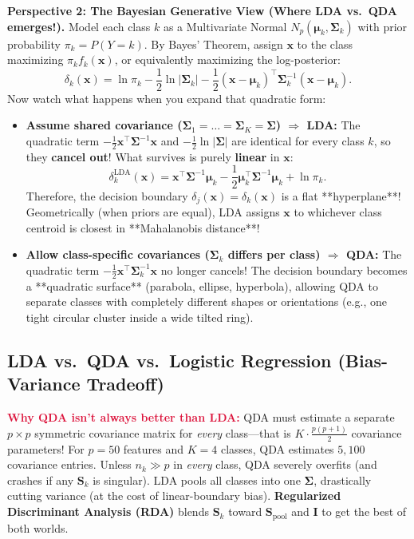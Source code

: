 \documentclass[11pt, a4paper]{article}
\begin{document}
\textbf{Perspective 2: The Bayesian Generative View (Where LDA vs.\ QDA emerges!).}
Model each class $k$ as a Multivariate Normal $N_p(\boldsymbol{\mu}_k, \boldsymbol{\Sigma}_k)$ with prior probability $\pi_k = P(Y = k)$. By Bayes' Theorem, assign $\mathbf{x}$ to the class maximizing $\pi_k f_k(\mathbf{x})$, or equivalently maximizing the log-posterior:
\[
    \delta_k(\mathbf{x}) = \ln \pi_k - \frac{1}{2}\ln|\boldsymbol{\Sigma}_k| - \frac{1}{2}(\mathbf{x} - \boldsymbol{\mu}_k)^\top \boldsymbol{\Sigma}_k^{-1}(\mathbf{x} - \boldsymbol{\mu}_k).
\]
Now watch what happens when you expand that quadratic form:
\begin{itemize}
    \item \textbf{Assume shared covariance ($\boldsymbol{\Sigma}_1 = \dots = \boldsymbol{\Sigma}_K = \boldsymbol{\Sigma}$) $\Longrightarrow$ LDA:}
    The quadratic term $-\frac{1}{2}\mathbf{x}^\top \boldsymbol{\Sigma}^{-1}\mathbf{x}$ and $-\frac{1}{2}\ln|\boldsymbol{\Sigma}|$ are identical for every class $k$, so they \textbf{cancel out}! What survives is purely \textbf{linear} in $\mathbf{x}$:
    \[
        \delta_k^{\text{LDA}}(\mathbf{x}) = \mathbf{x}^\top \boldsymbol{\Sigma}^{-1}\boldsymbol{\mu}_k - \frac{1}{2}\boldsymbol{\mu}_k^\top \boldsymbol{\Sigma}^{-1}\boldsymbol{\mu}_k + \ln \pi_k.
    \]
    Therefore, the decision boundary $\delta_j(\mathbf{x}) = \delta_k(\mathbf{x})$ is a flat **hyperplane**! Geometrically (when priors are equal), LDA assigns $\mathbf{x}$ to whichever class centroid is closest in **Mahalanobis distance**!
    \item \textbf{Allow class-specific covariances ($\boldsymbol{\Sigma}_k$ differs per class) $\Longrightarrow$ QDA:}
    The quadratic term $-\frac{1}{2}\mathbf{x}^\top \boldsymbol{\Sigma}_k^{-1}\mathbf{x}$ no longer cancels! The decision boundary becomes a **quadratic surface** (parabola, ellipse, hyperbola), allowing QDA to separate classes with completely different shapes or orientations (e.g., one tight circular cluster inside a wide tilted ring).
\end{itemize}

\subsection{LDA vs.\ QDA vs.\ Logistic Regression (Bias-Variance Tradeoff)}
\textcolor{crimson}{\textbf{Why QDA isn't always better than LDA:}} QDA must estimate a separate $p \times p$ symmetric covariance matrix for \emph{every} class---that is $K \cdot \frac{p(p+1)}{2}$ covariance parameters! For $p = 50$ features and $K = 4$ classes, QDA estimates $5{,}100$ covariance entries. Unless $n_k \gg p$ in \emph{every} class, QDA severely overfits (and crashes if any $\mathbf{S}_k$ is singular). LDA pools all classes into one $\boldsymbol{\Sigma}$, drastically cutting variance (at the cost of linear-boundary bias). \textbf{Regularized Discriminant Analysis (RDA)} blends $\mathbf{S}_k$ toward $\mathbf{S}_{\text{pool}}$ and $\mathbf{I}$ to get the best of both worlds.
\end{document}
